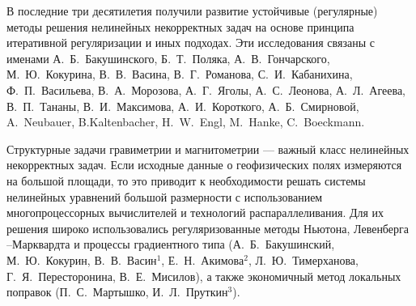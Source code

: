 \documentclass[%
autoref,     %
href,        %
facsimile,   %
colorlinks,  %
]{disser}
\begin{document}
	В последние три десятилетия получили развитие устойчивые (регулярные) методы решения нелинейных некорректных задач на основе принципа итеративной регуляризации и иных подходах. Эти исследования связаны с именами А.~Б.~Бакушинского, Б.~Т.~Поляка, А.~В.~Гончарского, М.~Ю.~Кокурина, В.~В.~Васина, В.~Г.~Романова, С.~И.~Кабанихина, Ф.~П.~Васильева, В.~А.~Морозова, А.~Г.~Яголы, А.~С.~Леонова, А.~Л.~Агеева, В.~П.~Тананы, В.~И.~Максимова, А.~И.~Короткого, А.~Б.~Смирновой, A.~Neubauer, B.Kaltenbacher, H.~W.~Engl, M.~Hanke, C.~Boeckmann.
	
	Структурные задачи гравиметрии и магнитометрии --- важный класс нелинейных некорректных задач. Если исходные данные о геофизических полях измеряются на большой площади, то это приводит к необходимости решать системы нелинейных уравнений большой размерности с использованием многопроцессорных вычислителей и технологий распараллеливания. Для их решения широко использовались регуляризованные методы Ньютона, Левенберга --Марквардта и процессы градиентного типа (А.~Б.~Бакушинский, М.~Ю.~Кокурин, В.~В.~Васин$^1$, Е.~Н.~Акимова$^2$, Л.~Ю.~Тимерханова, Г.~Я.~Пересторонина, В.~Е.~Мисилов), а также экономичный метод локальных поправок (П.~С.~Мартышко, И.~Л.~Пруткин$^3$).
	
	{\scriptsize
	\let\thefootnote\relax\let\thefootnote\relax{}
	\let\thefootnote\relax\let\thefootnote\relax{}
	\let\thefootnote\relax\let\thefootnote\relax{}
	} 
	
\end{document}

